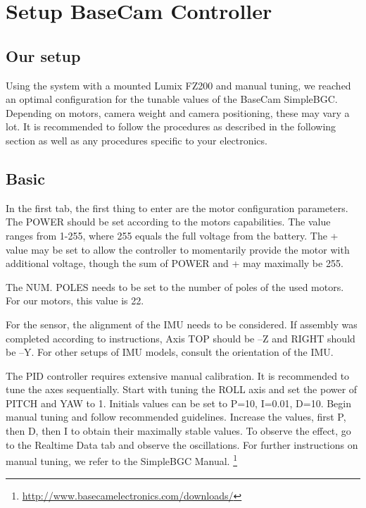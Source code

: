 \chapter{Setup BaseCam Controller}


\section{Our setup}
Using the system with a mounted Lumix FZ200 and manual tuning, we reached an optimal configuration for the tunable values of the BaseCam SimpleBGC. Depending on motors, camera weight and camera positioning, these may vary a lot. It is recommended to follow the procedures as described in the following section as well as any procedures specific to your electronics.

\section{Basic}
In the first tab, the first thing to enter are the motor configuration parameters. The POWER should be set according to the motors capabilities. The value ranges from 1-255, where 255 equals the full voltage from the battery. The + value may be set to allow the controller to momentarily provide the motor with additional voltage, though the sum of POWER and + may maximally be 255.\par
The NUM. POLES needs to be set to the number of poles of the used motors. For our motors, this value is 22.\par
For the sensor, the alignment of the IMU needs to be considered. If assembly was completed according to instructions, Axis TOP should be –Z and RIGHT should be –Y. For other setups of IMU models, consult the orientation of the IMU.\par
The PID controller requires extensive manual calibration. It is recommended to tune the axes sequentially. Start with tuning the ROLL axis and set the power of PITCH and YAW to 1. Initials values can be set to P=10, I=0.01, D=10. Begin manual tuning and follow recommended guidelines. Increase the values, first P, then D, then I to obtain their maximally stable values. To observe the effect, go to the Realtime Data tab and observe the oscillations. For further instructions on manual tuning, we refer to the SimpleBGC Manual. \footnote{\url{http://www.basecamelectronics.com/downloads/}}

